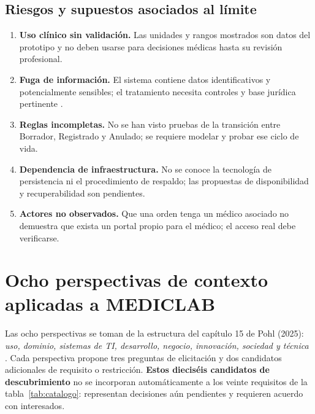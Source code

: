 \subsection{Riesgos y supuestos asociados al límite}
\begin{enumerate}
\item \textbf{Uso clínico sin validación.} Las unidades y rangos mostrados son datos del prototipo y no deben usarse para decisiones médicas hasta su revisión profesional.
\item \textbf{Fuga de información.} El sistema contiene datos identificativos y potencialmente sensibles; el tratamiento necesita controles y base jurídica pertinente \cite{lopdp2021}.
\item \textbf{Reglas incompletas.} No se han visto pruebas de la transición entre Borrador, Registrado y Anulado; se requiere modelar y probar ese ciclo de vida.
\item \textbf{Dependencia de infraestructura.} No se conoce la tecnología de persistencia ni el procedimiento de respaldo; las propuestas de disponibilidad y recuperabilidad son pendientes.
\item \textbf{Actores no observados.} Que una orden tenga un médico asociado no demuestra que exista un portal propio para el médico; el acceso real debe verificarse.
\end{enumerate}



\section{Ocho perspectivas de contexto aplicadas a MEDICLAB}
Las ocho perspectivas se toman de la estructura del capítulo 15 de Pohl (2025): \emph{uso, dominio, sistemas de TI, desarrollo, negocio, innovación, sociedad y técnica} \cite{pohl2025}. Cada perspectiva propone tres preguntas de elicitación y dos candidatos adicionales de requisito o restricción. \textbf{Estos dieciséis candidatos de descubrimiento} no se incorporan automáticamente a los veinte requisitos de la tabla~\ref{tab:catalogo}: representan decisiones aún pendientes y requieren acuerdo con interesados.

